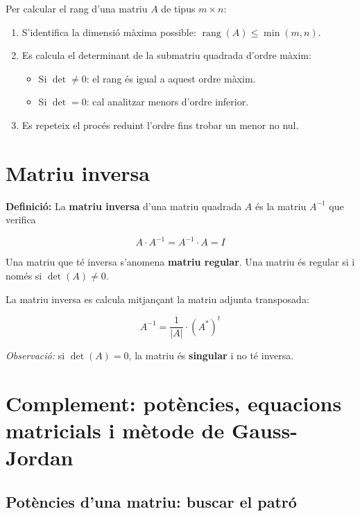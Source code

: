Per calcular el rang d'una matriu $A$ de tipus $m\times n$:

\begin{enumerate}
\item S'identifica la dimensió màxima possible: $\operatorname{rang}(A) \le \min(m, n)$.
\item Es calcula el determinant de la submatriu quadrada d'ordre màxim:
\begin{itemize}
\item Si $\det \neq 0$: el rang és igual a aquest ordre màxim.
\item Si $\det = 0$: cal analitzar menors d'ordre inferior.
\end{itemize}
\item Es repeteix el procés reduint l'ordre fins trobar un menor no nul.
\end{enumerate}

\section{Matriu inversa}

\textbf{Definició:} La \textbf{matriu inversa} d'una matriu quadrada $A$ és la matriu $A^{-1}$ que verifica

\begin{equation}
A\cdot A^{-1} = A^{-1}\cdot A = I
\end{equation}

Una matriu que té inversa s'anomena \textbf{matriu regular}. Una matriu és regular si i només si $\det(A) \neq 0$.

La matriu inversa es calcula mitjançant la matriu adjunta transposada:

\begin{equation*}
A^{-1} = \frac{1}{|A|}\cdot(A^*)^t
\end{equation*}

\emph{Observació:} si $\det(A) = 0$, la matriu és \textbf{singular} i no té inversa.

\section{Complement: potències, equacions matricials i mètode de Gauss-Jordan}

\subsection{Potències d'una matriu: buscar el patró}

